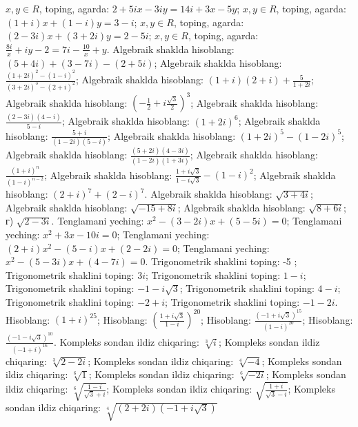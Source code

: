  $x, y \in R$, toping, agarda: $2+5 i x-3 i y=14 i+3 x-5 y$;
 $x, y \in R$, toping, agarda:  $(1+i) x+(1-i) y=3-i$;
 $x, y \in R$, toping, agarda: $(2-3 i) x+(3+2 i) y=2-5 i$;
$x, y \in R$, toping, agarda:  $\frac{8 i}{x}+i y-2=7 i-\frac{10}{x}+y$.
Algebraik shaklda hisoblang: $(5+4 i)+(3-7 i)-(2+5 i)$;
Algebraik shaklda hisoblang:  $\frac{(1+2 i)^2-(1-i)^2}{(3+2 i)^3-(2+i)^2}$;
Algebraik shaklda hisoblang:  $(1+i)(2+i)+\frac{5}{1+2 i}$;
Algebraik shaklda hisoblang:  $\left(-\frac{1}{2}+i \frac{\sqrt{3}}{2}\right)^3$;
Algebraik shaklda hisoblang: $\frac{(2-3 i)(4-i)}{5-i}$;
Algebraik shaklda hisoblang: $(1+2 i)^6$;
Algebraik shaklda hisoblang: $\frac{5+i}{(1-2 i)(5-i)}$;
Algebraik shaklda hisoblang: $(1+2 i)^5-(1-2 i)^5$;
Algebraik shaklda hisoblang: $\frac{(5+2 i)(4-3 i)}{(1-2 i)(1+3 i)}$;
Algebraik shaklda hisoblang: $\frac{(1+i)^n}{(1-i)^{n-2}}$;
Algebraik shaklda hisoblang: $\frac{1+i \sqrt{3}}{1-i \sqrt{3}}-(1-i)^2$;
Algebraik shaklda hisoblang: $(2+i)^7+(2-i)^7$.
Algebraik shaklda hisoblang:  $\sqrt{3+4 i}$;
Algebraik shaklda hisoblang: $\sqrt{-15+8 i}$;
Algebraik shaklda hisoblang: $\sqrt{8+6 i}$; г) $\sqrt{2-3 i}$.
Tenglamani yeching:  $x^2-(3-2 i) x+(5-5 i)=0$;
Tenglamani yeching:  $x^2+3 x-10 i=0$;
Tenglamani yeching:  $(2+i) x^2-(5-i) x+(2-2 i)=0$;
Tenglamani yeching:  $x^2-(5-3 i) x+(4-7 i)=0$.
Trigonometrik shaklini toping: -5 ; 
Trigonometrik shaklini toping: $3 i$;
Trigonometrik shaklini toping: $1-i$;
Trigonometrik shaklini toping: $-1-i \sqrt{3}$;
Trigonometrik shaklini toping: $4-i$;
Trigonometrik shaklini toping: $-2+i$;
Trigonometrik shaklini toping: $-1-2 i$.
Hisoblang:  $(1+i)^{25}$;
Hisoblang:  $\left(\frac{1+i \sqrt{3}}{1-i}\right)^{20}$;
Hisoblang:  $\frac{(-1+i \sqrt{3})^{15}}{(1-i)^{20}}$;
Hisoblang:  $\frac{(-1-i \sqrt{3})^{10}}{(-1+i)^{16}}$.
Kompleks sondan ildiz chiqaring:  $\sqrt[3]{i}$;
Kompleks sondan ildiz chiqaring: $\sqrt[3]{2-2 i}$;
Kompleks sondan ildiz chiqaring: $\sqrt[4]{-4}$;
Kompleks sondan ildiz chiqaring: $\sqrt[6]{1}$;
Kompleks sondan ildiz chiqaring: $\sqrt[6]{-2 i}$;
Kompleks sondan ildiz chiqaring: $\sqrt[6]{\frac{1-i}{\sqrt{3}+i}}$;
Kompleks sondan ildiz chiqaring: $\sqrt{\frac{1+i}{\sqrt{3}-i}}$;
Kompleks sondan ildiz chiqaring: $\sqrt[4]{(2+2 i)(-1+i \sqrt{3})}$